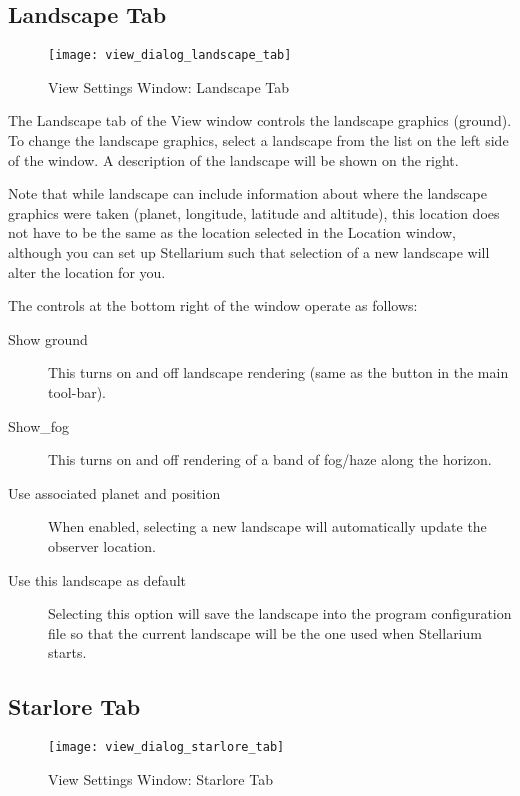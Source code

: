 \subsection{Landscape Tab}
\label{sec:gui:view:landscape}

\begin{figure}[t]
\centering\texttt{[image: view\_dialog\_landscape\_tab]}
\caption{View Settings Window: Landscape Tab}
\label{fig:gui:view:landscape}
\end{figure}

The Landscape tab of the View window controls the landscape graphics
(ground). To change the landscape graphics, select a landscape from the
list on the left side of the window. A description of the landscape will
be shown on the right.

Note that while landscape can include information about where the
landscape graphics were taken (planet, longitude, latitude and
altitude), this location does not have to be the same as the location
selected in the Location window, although you can set up Stellarium such
that selection of a new landscape will alter the location for you.

The controls at the bottom right of the window operate as follows:

\begin{description}
\item[Show ground] This turns on and off landscape rendering (same
  as the button in the main tool-bar).
\item[Show\_fog] This turns on and off rendering of a band of
  fog/haze along the horizon.
\item[Use associated planet and position] When enabled, selecting a
  new landscape will automatically update the observer location.
\item[Use this landscape as default] Selecting this option will save
  the landscape into the program configuration file so that the current
  landscape will be the one used when Stellarium starts.
\end{description}

\subsection{Starlore Tab}
\label{sec:gui:view:starlore}

\begin{figure}[t]
\centering\texttt{[image: view\_dialog\_starlore\_tab]}
\caption{View Settings Window: Starlore Tab}
\label{fig:gui:view:starlore}
\end{figure}

